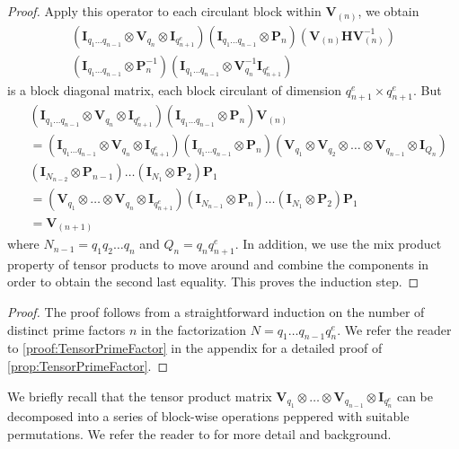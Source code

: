 \begin{proof}
    Apply this operator to each circulant block within \(\bm{V}_{(n)}\), we obtain
    \begin{multline*}
        \left(\bm{I}_{q_1\ldots q_{n-1}} \otimes \bm{V}_{q_n} \otimes \bm{I}_{q_{n+1}^e}\right) \left(\bm{I}_{q_1\ldots q_{n-1}} \otimes \bm{P}_n\right) \left(\bm{V}_{(n)} \bm{H} \bm{V}_{(n)}^{-1}\right) \\
        \left(\bm{I}_{q_1\ldots q_{n-1}} \otimes \bm{P}_n^{-1}\right) \left(\bm{I}_{q_1\ldots q_{n-1}} \otimes \bm{V}_{q_n}^{-1} \bm{I}_{q_{n+1}^e}\right)
    \end{multline*}
    is a block diagonal matrix, each block circulant of dimension \(q_{n+1}^e \times q_{n+1}^e\). But
    \begin{align*}
        &\left(\bm{I}_{q_1\ldots q_{n-1}} \otimes \bm{V}_{q_n} \otimes \bm{I}_{q_{n+1}^e}\right) \left(\bm{I}_{q_1\ldots q_{n-1}} \otimes \bm{P}_n\right) \bm{V}_{(n)} \\
        &= \left(\bm{I}_{q_1\ldots q_{n-1}} \otimes \bm{V}_{q_n} \otimes \bm{I}_{q_{n+1}^e}\right) \left(\bm{I}_{q_1\ldots q_{n-1}} \otimes \bm{P}_n\right) \left(\bm{V}_{q_1} \otimes \bm{V}_{q_2} \otimes \ldots \otimes \bm{V}_{q_{n-1}} \otimes \bm{I}_{Q_n}\right) \\
        &\left(\bm{I}_{N_{n-2}} \otimes \bm{P}_{n-1}\right) \dots \left(\bm{I}_{N_1} \otimes \bm{P}_2\right) \bm{P}_1 \\
        &= \left(\bm{V}_{q_1} \otimes \ldots \otimes \bm{V}_{q_{n}} \otimes \bm{I}_{q_{n+1}^e}\right) \left(\bm{I}_{N_{n-1}} \otimes \bm{P}_n\right) \dots \left(\bm{I}_{N_1} \otimes \bm{P}_2\right) \bm{P}_1 \\
        &= \bm{V}_{(n+1)}
    \end{align*}
    where \(N_{n-1} = q_1 q_2 \ldots q_n\) and \(Q_n = q_n q_{n+1}^e\). In addition, we use the mix product property of tensor products to move around and combine the components in order to obtain the second last equality. This proves the induction step.
\end{proof}
\else
\begin{proof}
    The proof follows from a straightforward induction on the number of distinct prime factors \(n\) in the factorization \(N = q_1 \ldots q_{n-1} q_n^e\). We refer the reader to \cref{proof:TensorPrimeFactor} in the appendix for a detailed proof of \cref{prop:TensorPrimeFactor}.
\end{proof}
\fi

We briefly recall that the tensor product matrix \(\bm{V}_{q_1} \otimes \ldots \otimes \bm{V}_{q_{n-1}} \otimes \bm{I}_{q_n^e}\) can be decomposed into a series of block-wise operations peppered with suitable permutations. We refer the reader to \cite[Chapter~2]{BOOK:LRTMAC89} for more detail and background.

